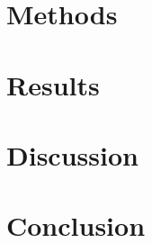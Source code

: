 \documentclass[sigconf]{acmart}
\begin{document}
\section{Methods}

\section{Results}

\section{Discussion}

\section{Conclusion}




\end{document}
